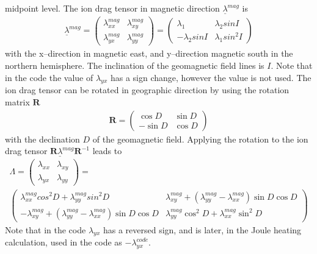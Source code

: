 midpoint level. The ion drag tensor in magnetic direction
$\underline{\lambda}^{mag}$ is
%
\begin{gather}
  \underline{\lambda}^{mag}=
   \begin{pmatrix}
      \lambda_{xx}^{mag} & \lambda_{xy}^{mag} \\
      \lambda_{yx}^{mag} & \lambda_{yy}^{mag}
   \end{pmatrix} =
   \begin{pmatrix}
      \lambda_1 & \lambda_{2}sin I\\
      -\lambda_2 sin I & \lambda_{1} sin^2 I
   \end{pmatrix}
\end{gather}
%
with the x--direction in magnetic east, and y--direction magnetic
south in the northern hemisphere. The inclination of the geomagnetic
field lines is $I$. Note that in the code the value of
$\lambda_{yx}$ has a sign change, however the value is not used. The
ion drag tensor can be rotated in geographic direction by using the
rotation matrix $\mathbf{R}$
%
\begin{gather}
   \mathbf{R} =
   \begin{pmatrix}
      \cos D & \sin D\\
     -\sin D & \cos D
   \end{pmatrix}
\end{gather}
%
with the declination $D$ of the geomagnetic field. Applying the
rotation to the ion drag tensor
$\mathbf{R}\underline{\lambda}^{mag}\mathbf{R}^{-1}$ leads to
%
\begin{gather}
  \Lambda =
   \begin{pmatrix}
  \lambda_{xx} & \lambda_{xy}  \\
  \lambda_{yx} & \lambda_{yy}
   \end{pmatrix}
      = \\
   \begin{pmatrix}
  \lambda_{xx}^{mag} cos^2 D + \lambda_{yy}^{mag}
  sin^2 D &  \lambda_{xy}^{mag} + (\lambda_{yy}^{mag}-
  \lambda_{xx}^{mag}) \sin D \cos D  \\
  -\lambda_{xy}^{mag} + (\lambda_{yy}^{mag}-
  \lambda_{xx}^{mag}) \sin D \cos D  & \lambda_{yy}^{mag} \cos^2 D + \lambda_{xx}^{mag}
  \sin^2 D
   \end{pmatrix}
\end{gather}
%
Note that in the code $\lambda_{yx}$ has a reversed sign, and is
later, in the Joule heating calculation, used in the code as
$-\lambda_{yx}^{code}$.
